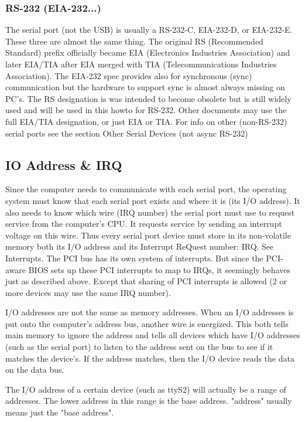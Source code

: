 \documentclass[11pt, twosides, titlepage]{article}
\begin{document}
        \subsubsection{RS-232 (EIA-232...)}

            The serial port (not the USB) is usually a RS-232-C, EIA-232-D, or EIA-232-E. These three are almost the same thing. The original RS (Recommended Standard) prefix officially became EIA (Electronics Industries Association) and later EIA/TIA after EIA merged with TIA (Telecommunications Industries Association). The EIA-232 spec provides also for synchronous (sync) communication but the hardware to support sync is almost always missing on PC's. The RS designation is was intended to become obsolete but is still widely used and will be used in this howto for RS-232. Other documents may use the full EIA/TIA designation, or just EIA or TIA. For info on other (non-RS-232) serial ports see the section Other Serial Devices (not async RS-232)

    \subsection{IO Address \& IRQ}

        Since the computer needs to communicate with each serial port, the operating system must know that each serial port exists and where it is (its I/O address). It also needs to know which wire (IRQ number) the serial port must use to request service from the computer's CPU. It requests service by sending an interrupt voltage on this wire. Thus every serial port device must store in its non-volatile memory both its I/O address and its Interrupt ReQuest number: IRQ. See Interrupts. The PCI bus has its own system of interrupts. But since the PCI-aware BIOS sets up these PCI interrupts to map to IRQs, it seemingly behaves just as described above. Except that sharing of PCI interrupts is allowed (2 or more devices may use the same IRQ number).

        I/O addresses are not the same as memory addresses. When an I/O addresses is put onto the computer's address bus, another wire is energized. This both tells main memory to ignore the address and tells all devices which have I/O addresses (such as the serial port) to listen to the address sent on the bus to see if it matches the device's. If the address matches, then the I/O device reads the data on the data bus.
        
        The I/O address of a certain device (such as ttyS2) will actually be a range of addresses. The lower address in this range is the base address. "address" usually means just the "base address".
\end{document}
